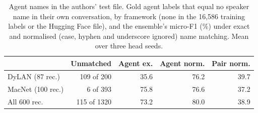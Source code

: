\begin{table}[t]
\caption{Agent names in the authors' test file. Gold agent labels that equal no speaker name in their own conversation, by framework (none in the 16,586 training labels or the Hugging Face file), and the ensemble's micro-F1 (\%) under exact and normalised (case, hyphen and underscore ignored) name matching. Mean over three head seeds.}
\label{tab:names}
\centering\footnotesize\setlength{\tabcolsep}{2pt}
\begin{tabular}{@{}lrrrr@{}}
\toprule
 & Unmatched & Agent ex. & Agent norm. & Pair norm. \\
\midrule
DyLAN (87 rec.) & 109 of 200 & 35.6 & 76.2 & 39.7 \\
MacNet (100 rec.) & 6 of 393 & 75.8 & 76.6 & 37.2 \\
All 600 rec. & 115 of 1320 & 73.2 & 80.0 & 38.9 \\
\bottomrule
\end{tabular}
\end{table}
